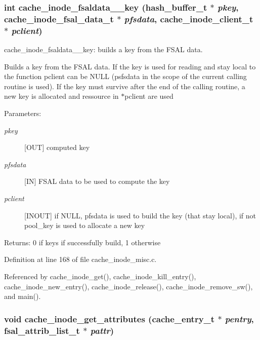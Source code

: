 \subsubsection{\setlength{\rightskip}{0pt plus 5cm}int cache\_\-inode\_\-fsaldata\_\_\-key (hash\_\-buffer\_\-t $\ast$ {\em pkey}, cache\_\-inode\_\-fsal\_\-data\_\-t $\ast$ {\em pfsdata}, cache\_\-inode\_\-client\_\-t $\ast$ {\em pclient})}\label{cache__inode__misc_8c_a1}


cache\_\-inode\_\-fsaldata\_\_\-key: builds a key from the FSAL data.

Builds a key from the FSAL data. If the key is used for reading and stay local to the function pclient can be NULL (psfsdata in the scope of the current calling routine is used). If the key must survive after the end of the calling routine, a new key is allocated and ressource in $\ast$pclient are used

\begin{Desc}
\item[Parameters:]
\begin{description}
\item[{\em pkey}][OUT] computed key \item[{\em pfsdata}][IN] FSAL data to be used to compute the key \item[{\em pclient}][INOUT] if NULL, pfsdata is used to build the key (that stay local), if not pool\_\-key is used to allocate a new key \end{description}
\end{Desc}
\begin{Desc}
\item[Returns:]0 if keys if successfully build, 1 otherwise \end{Desc}


Definition at line 168 of file cache\_\-inode\_\-misc.c.

Referenced by cache\_\-inode\_\-get(), cache\_\-inode\_\-kill\_\-entry(), cache\_\-inode\_\-new\_\-entry(), cache\_\-inode\_\-release(), cache\_\-inode\_\-remove\_\-sw(), and main().
\subsubsection{\setlength{\rightskip}{0pt plus 5cm}void cache\_\-inode\_\-get\_\-attributes (cache\_\-entry\_\-t $\ast$ {\em pentry}, fsal\_\-attrib\_\-list\_\-t $\ast$ {\em pattr})}\label{cache__inode__misc_8c_a7}


